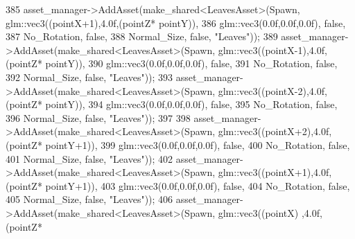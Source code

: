 \begin{DoxyCode}
385             asset\_manager->AddAsset(make\_shared<LeavesAsset>(Spawn, glm::vec3((pointX+1),4.0f,(pointZ*
      pointY)),
386                                                              glm::vec3(0.0f,0.0f,0.0f), \textcolor{keyword}{false},
387                                                              No\_Rotation, \textcolor{keyword}{false},
388                                                              Normal\_Size, \textcolor{keyword}{false}, \textcolor{stringliteral}{"Leaves"}));
389             asset\_manager->AddAsset(make\_shared<LeavesAsset>(Spawn, glm::vec3((pointX-1),4.0f,(pointZ*
      pointY)),
390                                                              glm::vec3(0.0f,0.0f,0.0f), \textcolor{keyword}{false},
391                                                              No\_Rotation, \textcolor{keyword}{false},
392                                                              Normal\_Size, \textcolor{keyword}{false}, \textcolor{stringliteral}{"Leaves"}));
393             asset\_manager->AddAsset(make\_shared<LeavesAsset>(Spawn, glm::vec3((pointX-2),4.0f,(pointZ*
      pointY)),
394                                                              glm::vec3(0.0f,0.0f,0.0f), \textcolor{keyword}{false},
395                                                              No\_Rotation, \textcolor{keyword}{false},
396                                                              Normal\_Size, \textcolor{keyword}{false}, \textcolor{stringliteral}{"Leaves"}));
397  
398             asset\_manager->AddAsset(make\_shared<LeavesAsset>(Spawn, glm::vec3((pointX+2),4.0f,(pointZ*
      pointY+1)),
399                                                              glm::vec3(0.0f,0.0f,0.0f), \textcolor{keyword}{false},
400                                                              No\_Rotation, \textcolor{keyword}{false},
401                                                              Normal\_Size, \textcolor{keyword}{false}, \textcolor{stringliteral}{"Leaves"}));
402             asset\_manager->AddAsset(make\_shared<LeavesAsset>(Spawn, glm::vec3((pointX+1),4.0f,(pointZ*
      pointY+1)),
403                                                              glm::vec3(0.0f,0.0f,0.0f), \textcolor{keyword}{false},
404                                                              No\_Rotation, \textcolor{keyword}{false},
405                                                              Normal\_Size, \textcolor{keyword}{false}, \textcolor{stringliteral}{"Leaves"}));
406             asset\_manager->AddAsset(make\_shared<LeavesAsset>(Spawn, glm::vec3((pointX)  ,4.0f,(pointZ*

\end{DoxyCode}
